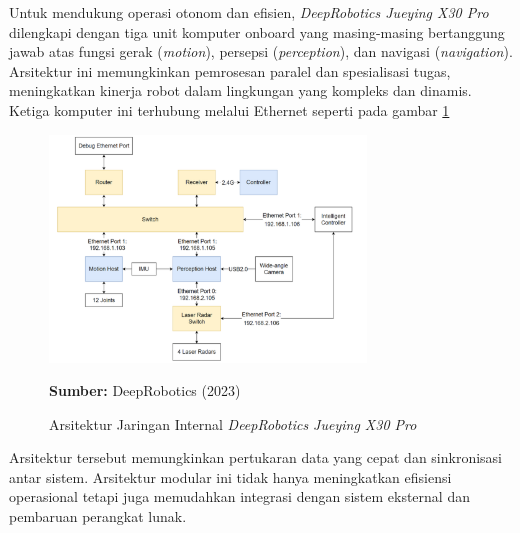 \noindent
Untuk mendukung operasi otonom dan efisien, \emph{DeepRobotics Jueying X30 Pro} dilengkapi dengan tiga unit komputer onboard yang masing-masing bertanggung jawab atas fungsi gerak (\emph{motion}), persepsi (\emph{perception}), dan navigasi (\emph{navigation}). Arsitektur ini memungkinkan pemrosesan paralel dan spesialisasi tugas, meningkatkan kinerja robot dalam lingkungan yang kompleks dan dinamis. Ketiga komputer ini terhubung melalui  Ethernet seperti pada gambar \ref{fig:network_architecture_x30pro}
\begin{figure}[H]
  \centering
  \includegraphics[width=0.75\textwidth]{gambar/bab2/network-x30.png}
  \caption{Arsitektur Jaringan Internal \emph{DeepRobotics Jueying X30 Pro}}
  \label{fig:network_architecture_x30pro}
  \footnotesize{\textbf{Sumber:} DeepRobotics (2023)}
\end{figure}


Arsitektur tersebut memungkinkan pertukaran data yang cepat dan sinkronisasi antar sistem. Arsitektur modular ini tidak hanya meningkatkan efisiensi operasional tetapi juga memudahkan integrasi dengan sistem eksternal dan pembaruan perangkat lunak.



